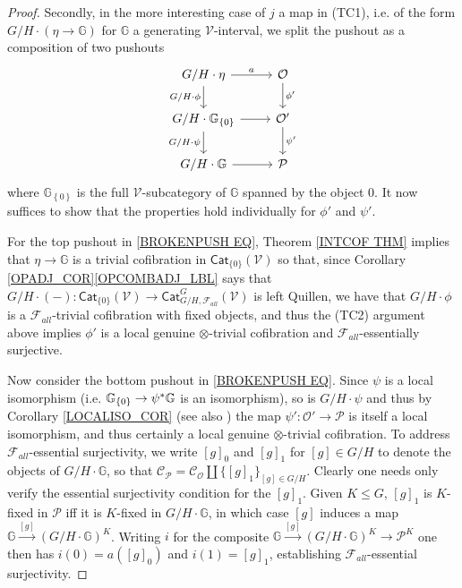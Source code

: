 \documentclass[a4paper,10pt
,draft
]{article}%
\numberwithin{equation}{section}
\numberwithin{figure}{section}
\theoremstyle{definition} %
\newcommand{\set}[1]{\left\{#1\right\}}%
\newcommand{\F}{\ensuremath{\mathcal F}}
\newcommand{\V}{\ensuremath{\mathcal V}}
\renewcommand{\O}{\ensuremath{\mathcal O}}
\renewcommand{\P}{\ensuremath{\mathcal P}}
\newcommand{\C}{\ensuremath{\mathcal C}}
\newcommand{\1}{\ensuremath{\mathbbm 1}}%
\begin{document}
\begin{proof}
     
	Secondly, in the more interesting case of $j$ a map in (TC1), 
	i.e. of the form $G/H \cdot (\eta \to \mathbb{G})$ for $\mathbb{G}$ a generating $\V$-interval,
	we split the pushout as a composition of two pushouts 
\begin{equation}\label{BROKENPUSH EQ}
\begin{tikzcd}
	G/H \cdot \eta \arrow[r, "a"] \arrow[d, "G/H \cdot \phi"']
&
	\O \arrow[d,"\phi'"]
\\
	G/H \cdot \mathbb{G}_{\set{0}} \arrow[r] \arrow[d, "G/H \cdot \psi"']
&
	\O' \arrow[d,"\psi'"]
\\
	G/H \cdot \mathbb{G} \arrow[r]
&
	\P
\end{tikzcd}
\end{equation}
      where $\mathbb{G}_{\set{0}}$ is the full $\V$-subcategory of $\mathbb{G}$ spanned by the object $0$.
      It now suffices to show that the properties hold individually for $\phi'$ and $\psi'$.
 
      
      For the top pushout in \eqref{BROKENPUSH EQ}, Theorem \ref{INTCOF THM} implies that $\eta \to \mathbb{G}$
      is a trivial cofibration in $\mathsf{Cat}_{\{0\}}(\V)$
      so that, since Corollary \ref{OPADJ_COR}\ref{OPCOMBADJ_LBL} %
      says that $G/H \cdot (-) \colon \mathsf{Cat}_{\{0\}}(\V) \to \mathsf{Cat}^G_{G/H,\F_{all}}(\V)$ is left Quillen,
      we have that $G/H \cdot \phi$ is a $\F_{all}$-trivial cofibration with fixed objects,
      and thus the (TC2) argument above implies $\phi'$ is
      a local genuine $\otimes$-trivial cofibration and
      $\F_{all}$-essentially surjective.
      
	Now consider the bottom pushout in \eqref{BROKENPUSH EQ}.
	Since $\psi$ is a local isomorphism (i.e. $\mathbb{G}_{\{0\}} \to \psi^{\**}\mathbb{G}$ is an isomorphism),
	so is $G/H \cdot \psi$ and thus by Corollary \ref{LOCALISO_COR} (see also \cite[Prop. B.22]{Cav})
	the map $\psi' \colon \O' \to \mathcal{P}$
	is itself a local isomorphism, and thus certainly a local genuine $\otimes$-trivial cofibration.
% 
	To address $\F_{all}$-essential surjectivity, 
	we write $[g]_0$ and $[g]_1$ for $[g] \in G/H$
	to denote the objects of $G/H \cdot \mathbb{G}$,
	so that $\C_{\P} = \C_{\O} \amalg \{[g]_1\}_{[g] \in G/H}$.
	Clearly one needs only verify the essential surjectivity condition for the $[g]_1$.
	Given $K \leq G$,
	$[g]_1$ is $K$-fixed in $\P$ iff it is $K$-fixed in $G/H \cdot \mathbb{G}$,
	in which case $[g]$ induces a map
	$\mathbb{G} \xrightarrow{[g]} \left(G/H \cdot \mathbb{G}\right)^K$.
	Writing $i$ for the composite 
	$\mathbb{G} \xrightarrow{[g]} \left(G/H \cdot \mathbb{G}\right)^K \to \P^K$
	one then has $i(0) = a([g]_0)$ and $i(1)=[g]_1$,
	establishing $\F_{all}$-essential surjectivity.
\end{proof}
\end{document}
